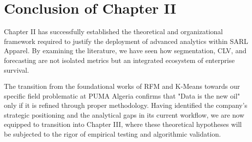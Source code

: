 \documentclass[12pt,a4paper]{report}
\begin{document}
\section*{Conclusion of Chapter II}
Chapter II has successfully established the theoretical and organizational framework required to justify the deployment of advanced analytics within SARL Apparel. By examining the literature, we have seen how segmentation, CLV, and forecasting are not isolated metrics but an integrated ecosystem of enterprise survival. 

The transition from the foundational works of RFM and K-Means towards our specific field problematic at PUMA Algeria confirms that "Data is the new oil" only if it is refined through proper methodology. Having identified the company's strategic positioning and the analytical gaps in its current workflow, we are now equipped to transition into Chapter III, where these theoretical hypotheses will be subjected to the rigor of empirical testing and algorithmic validation.
\end{document}
